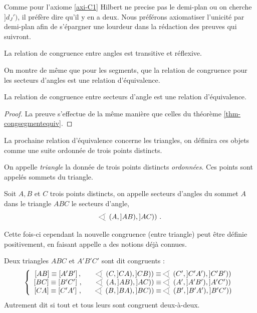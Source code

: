 Comme pour l'axiome \ref{axi-C1} Hilbert ne precise pas le demi-plan ou on cherche $]d_J')$, il préfère dire qu'il y en a deux. Nous préférons axiomatiser l'unicité par demi-plan afin de s'épargner une lourdeur dans la rédaction des preuves qui suivront. 
\begin{axi}\label{axi-C5}
    La relation de congruence entre angles est transitive et réflexive. 
\end{axi}
On montre de même que pour les segments, que la relation de congruence pour les secteurs d'angles est une relation d'équivalence.
\begin{thm}
    La relation de congruence entre secteurs d'angle est une relation d'équivalence.
\begin{proof}
    La preuve s'effectue de la même manière que celles du théorème \ref{thm-congsegmentequiv}.
\end{proof}
\end{thm}
La prochaine relation d'équivalence concerne les triangles, on définira ces objets  comme une suite ordonnée de trois points distincts. 
\begin{defi}[Triangle]
    On appelle \emph{triangle} la donnée de trois points distincts \emph{ordonnées}. Ces points sont appelés sommets du triangle.
\end{defi}
\begin{defi}
    Soit $A,B$ et $C$ trois points distincts, on appelle secteurs d'angles du sommet $A$ dans le triangle $ABC$ le secteurs d'angle,
    \begin{equation*}
        \anglesaillant\left(A,]AB),]AC)\right)\,.
    \end{equation*}
\end{defi}
Cette fois-ci cependant la nouvelle congruence (entre triangle) peut être définie positivement, \cad en faisant appelle a des notions déjà connues. 
\begin{defi}
    Deux triangles $ABC$ et $A'B'C'$ sont dit congruents \ssi :
    \begin{equation*}
        \left\{
        \begin{array}{ccc}
            [AB] \equiv [A'B']\,, &&  \anglesaillant\left(C,]CA),]CB)\right)\equiv \anglesaillant\left(C',]C'A'),]C'B')\right) \\
            \left[BC\right] \equiv \left[B'C'\right] \,, && \anglesaillant\left(A,]AB),]AC)\right)\equiv \anglesaillant\left(A',]A'B'),]A'C')\right) \\
            \left[CA\right] \equiv \left[C'A'\right]\,, && \anglesaillant\left(B,]BA),]BC)\right)\equiv \anglesaillant\left(B',]B'A'),]B'C')\right)
        \end{array}
        \right.
    \end{equation*}
Autrement dit si tout  et tous leurs  sont congruent deux-à-deux.
\end{defi}
